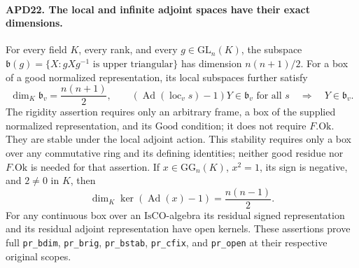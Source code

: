 \documentclass[11pt,a4paper]{article}
\numberwithin{equation}{section}
\theoremstyle{remark}\newtheorem{remark}[theorem]{Remark}
\begin{document}
\paragraph{APD22. The local and infinite adjoint spaces have their exact dimensions.}
\label{claim:APD22}
For every field \(K\), every rank, and every
\(g\in\mathrm{GL}_n(K)\), the subspace
\(\mathfrak b(g)=\{X:gXg^{-1}\text{ is upper triangular}\}\)
has dimension \(n(n+1)/2\).  For a box of a good normalized
representation, its local subspaces further satisfy
\[
 \dim_K\mathfrak b_v=\frac{n(n+1)}2,
 \qquad
 (\operatorname{Ad}(\operatorname{loc}_v s)-1)Y\in\mathfrak b_v
 \text{ for all }s\quad\Longrightarrow\quad Y\in\mathfrak b_v.
                                                               \tag{APD.42}
\]
The rigidity assertion requires only an arbitrary frame, a box
of the supplied normalized representation, and its
\(\mathrm{Good}\) condition; it does not require
\(F.\mathrm{Ok}\).  They are stable under the local adjoint
action.  This stability
requires only a box over any commutative ring and its defining
identities; neither good residue nor \(F.\mathrm{Ok}\) is
needed for that assertion.  If
\(x\in\mathrm{GG}_n(K)\), \(x^2=1\), its sign is negative,
and \(2\ne0\) in \(K\), then
\[
            \dim_K\ker(\operatorname{Ad}(x)-1)
                              =\frac{n(n-1)}2.            \tag{APD.43}
\]
For any continuous box over an \(\mathrm{IsCO}\)-algebra its
residual signed representation and its residual adjoint
representation have open kernels.  These assertions prove full
\texttt{pr\_\allowbreak bdim}, \texttt{pr\_\allowbreak brig}, \texttt{pr\_\allowbreak bstab},
\texttt{pr\_\allowbreak cfix}, and \texttt{pr\_\allowbreak open} at their respective
original scopes.
\end{document}
